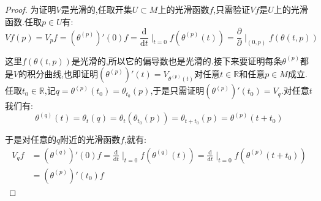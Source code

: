 \begin{enumerate}
\begin{proof}
		为证明$V$是光滑的,任取开集$U\subset M$上的光滑函数$f$,只需验证$Vf$是$U$上的光滑函数.任取$p\in U$有:$$Vf(p)=V_pf=(\theta^{(p)})'(0)f=\frac{\mathrm{d}}{\mathrm{d}t}\mid_{t=0}f(\theta^{(p)}(t))=\frac{\partial}{\partial}\mid_{(0,p)}f(\theta(t,p))$$
		
		这里$f(\theta(t,p))$是光滑的,所以它的偏导数也是光滑的.接下来要证明每条$\theta^{(p)}$都是$V$的积分曲线,也即证明$(\theta^{(p)})'(t)=V_{\theta^{(p)}(t)}$对任意$t\in\mathbb{R}$和任意$p\in M$成立.任取$t_0\in\mathbb{R}$,记$q=\theta^{(p)}(t_0)=\theta_{t_0}(p)$,于是只需证明$(\theta^{(p)})'(t_0)=V_q$.对任意$t$我们有:
		$$\theta^{(q)}(t)=\theta_t(q)=\theta_t(\theta_{t_0}(p))=\theta_{t+t_0}(p)=\theta^{(p)}(t+t_0)$$
		
		于是对任意的$q$附近的光滑函数$f$,就有:
		\begin{align*}
		V_qf&=(\theta^{(q)})'(0)f=\frac{\mathrm{d}}{\mathrm{d}t}\mid_{t=0}f(\theta^{(q)}(t))=\frac{\mathrm{d}}{\mathrm{d}t}\mid_{t=0}f(\theta^{(p)}(t+t_0))\\&=(\theta^{(p)})'(t_0)f
		\end{align*}
	\end{proof}
\end{enumerate}

